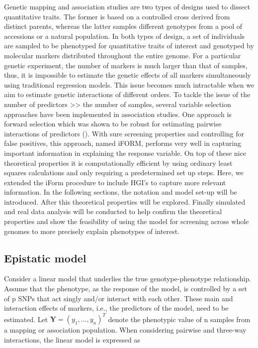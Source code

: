 \documentclass[11pt,]{book}
\theoremstyle{definition}
\theoremstyle{definition}
\theoremstyle{remark}
\begin{document}
Genetic mapping and association studies are two types of designs used to
dissect quantitative traits. The former is based on a controlled cross
derived from distinct parents, whereas the latter samples different
genotypes from a pool of accessions or a natural population. In both
types of design, a set of individuals are sampled to be phenotyped for
quantitative traits of interest and genotyped by molecular markers
distributed throughout the entire genome. For a particular genetic
experiment, the number of markers is much larger than that of samples,
thus, it is impossible to estimate the genetic effects of all markers
simultaneously using traditional regression models. This issue becomes
much intractable when we aim to estimate genetic interactions of
different orders. To tackle the issue of the number of predictors
\textgreater{}\textgreater{} the number of samples, several variable
selection approaches have been implemented in association studies. One
approach is forward selection which was shown to be robust for
estimating pairwise interactions of predictors
(\cite{hao2014interaction}). With sure screening properties and
controlling for false positives, this approach, named iFORM, performs
very well in capturing important information in explaining the response
variable. On top of these nice theoretical properties it is
computationally efficient by using ordinary least squares calculations
and only requiring a predetermined set up steps. Here, we extended the
iForm procedure to include HGI's to capture more relevant information.
In the following sections, the notation and model set-up will be
introduced. After this theoretical properties will be explored. Finally
simulated and real data analysis will be conducted to help confirm the
theoretical properties and show the feasibility of using the model for
screening across whole genomes to more precisely explain phenotypes of
interest.

\subsection{Epistatic model}\label{epistatic-model}

Consider a linear model that underlies the true genotype-phenotype
relationship. Assume that the phenotype, as the response of the model,
is controlled by a set of p SNPs that act singly and/or interact with
each other. These main and interaction effects of markers, i.e., the
predictors of the model, need to be estimated. Let
\(\mathbf{Y}=(y_1,\dots, y_n)^T\) denote the phenotypic value of n
samples from a mapping or association population. When considering
pairwise and three-way interactions, the linear model is expressed as
\end{document}
